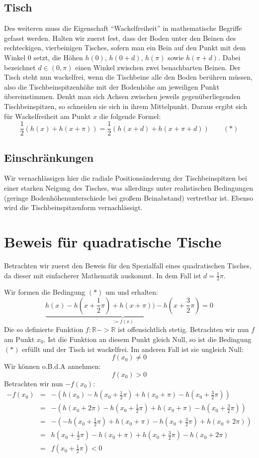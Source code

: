 \documentclass{amsart}
\begin{document}
\subsection{Tisch}
Des weiteren muss die Eigenschaft "`Wackelfreiheit"' in mathematische Begriffe gefasst werden. Halten wir zuerst fest, dass der Boden unter den Beinen des rechteckigen, vierbeinigen Tisches, sofern man ein Bein auf den Punkt mit dem Winkel 0 setzt, die Höhen $h(0)$, $h(0+d)$, $h(\pi)$ sowie $h(\pi + d)$. Dabei bezeichnet $d \in (0,\pi)$ einen Winkel zwischen zwei benachbarten Beinen. Der Tisch steht nun wackelfrei, wenn die Tischbeine alle den Boden berühren müssen, also die Tischbeinspitzenhöhe mit der Bodenhöhe am jeweiligen Punkt übereinstimmen. Denkt man sich Achsen zwischen jeweils gegenüberliegenden Tischbeinspitzen, so schneiden sie sich in ihrem Mittelpunkt. Daraus ergibt sich für Wackelfreiheit am Punkt $x$ die folgende Formel:
$$ \frac{1}{2}(h(x) + h(x+\pi)) = \frac{1}{2}( h(x+d) + h(x+\pi+d)) \qquad (*) $$

\subsection{Einschränkungen}
Wir vernachlässigen hier die radiale Positionsänderung der Tischbeinspitzen bei einer starken Neigung des Tisches, was allerdings unter realistischen Bedingungen (geringe  Bodenhöhenunterschiede bei großem Beinabstand) vertretbar ist. Ebenso wird die Tischbeinspitzenform vernachlässigt.


\section{Beweis für quadratische Tische}

Betrachten wir zuerst den Beweis für den Spezialfall eines quadratischen Tisches, da dieser mit einfacherer Mathematik auskommt. In dem Fall ist $d=\frac{1}2\pi$.

Wir formen die Bedingung $(*)$ um und erhalten:
$$ \underbrace{h(x) - h(x+\frac{1}{2}\pi) + h(x+\pi)) - h(x+\frac{3}{2}\pi)}_{:= f(x)} = 0$$
Die so definierte Funktion $f:\mathbb{R}->\mathbb{R}$ ist offensichtlich stetig. Betrachten wir nun $f$ am Punkt $x_0$. Ist die Funktion an diesem Punkt gleich Null, so ist die Bedingung $(*)$ erfüllt und der Tisch ist wackelfrei. Im anderen Fall ist sie ungleich Null:
$$ f(x_0) \ne 0 $$
Wir können o.B.d.A annehmen:
$$ f(x_0) > 0 $$
Betrachten wir nun $-f(x_0)$:
\begin{eqnarray*}
-f(x_0) & =& -(h(x_0) - h(x_0+\frac{1}{2}\pi) + h(x_0+\pi) - h(x_0+\frac{3}{2}\pi)) \\
        & =& -( h(x_0+2\pi) - h(x_0+\frac{1}{2}\pi) + h(x_0+\pi) - h(x_0+\frac{3}{2}\pi) )\\
        & =&-(- h(x_0+\frac{1}{2}\pi) + h(x_0+\pi) - h(x_0+\frac{3}{2}\pi) +h(x_0+2\pi))\\
        & =& h(x_0+\frac{1}{2}\pi) - h(x_0+\pi) + h(x_0+\frac{3}{2}\pi) - h(x_0+2\pi) \\
	&=& f(x_0+ \frac{1}{2}\pi) < 0 
\end{eqnarray*}
\end{document}
